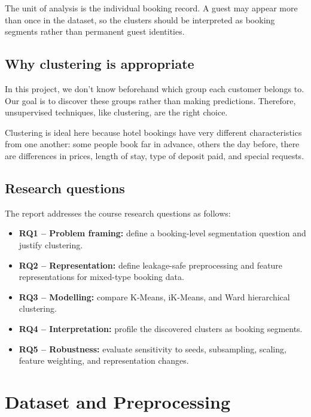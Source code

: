 \documentclass[11pt,a4paper]{article}
\begin{document}
The unit of analysis is the individual booking record. A guest may appear more than once in the dataset, so the clusters should be interpreted as booking segments rather than permanent guest identities.

\subsection{Why clustering is appropriate}
In this project, we don't know beforehand which group each customer belongs to. Our goal is to discover these groups rather than making predictions. Therefore, unsupervised techniques, like clustering, are the right choice.

Clustering is ideal here because hotel bookings have very different characteristics from one another: some people book far in advance, others the day before, there are differences in prices, length of stay, type of deposit paid, and special requests.
\subsection{Research questions}
The report addresses the course research questions as follows:
\begin{itemize}
    \item \textbf{RQ1 -- Problem framing:} define a booking-level segmentation question and justify clustering.
    \item \textbf{RQ2 -- Representation:} define leakage-safe preprocessing and feature representations for mixed-type booking data.
    \item \textbf{RQ3 -- Modelling:} compare K-Means, iK-Means, and Ward hierarchical clustering.
    \item \textbf{RQ4 -- Interpretation:} profile the discovered clusters as booking segments.
    \item \textbf{RQ5 -- Robustness:} evaluate sensitivity to seeds, subsampling, scaling, feature weighting, and representation changes.
\end{itemize}

\section{Dataset and Preprocessing}
\end{document}
